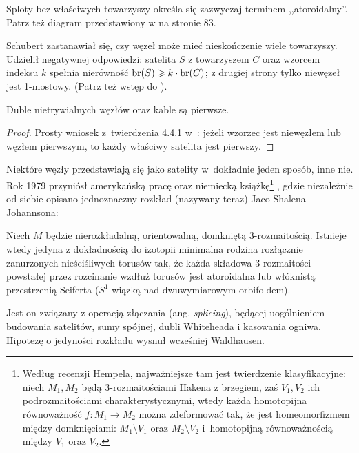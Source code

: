 Sploty bez właściwych towarzyszy określa się zazwyczaj terminem ,,atoroidalny''.
%
Patrz też diagram przedstawiony w \cite{cromwell2004} na stronie 83.

Schubert \cite{schubert1954} zastanawiał się, czy węzeł może mieć nieskończenie wiele towarzyszy.
Udzielił negatywnej odpowiedzi: satelita $S$ z towarzyszem $C$ oraz wzorcem indeksu $k$ spełnia nierówność $\operatorname{br}(S) \geqslant k \cdot \operatorname{br}(C)$; z drugiej strony tylko niewęzeł jest 1-mostowy.
(Patrz też wstęp do \cite{schultens2003}).

\begin{proposition}
    Duble nietrywialnych węzłów oraz kable są pierwsze.
\end{proposition}

\begin{proof}
    Prosty wniosek z~twierdzenia 4.4.1 w~\cite[s. 84]{cromwell2004}: jeżeli wzorzec jest niewęzłem lub węzłem pierwszym, to każdy właściwy satelita jest pierwszy.
\end{proof}

Niektóre węzły przedstawiają się jako satelity w~dokładnie jeden sposób, inne nie.
Rok 1979 przyniósł amerykańską pracę \cite{jaco1979} oraz niemiecką książkę\footnote{Według recenzji Hempela, najważniejsze tam jest twierdzenie klasyfikacyjne: niech $M_1, M_2$ będą 3-rozmaitościami Hakena  z brzegiem, zaś $V_1, V_2$ ich podrozmaitościami charakterystycznymi, wtedy każda homotopijna równoważność $f \colon M_1 \to M_2$ można zdeformować tak, że jest homeomorfizmem między domknięciami: $M_1 \setminus V_1$ oraz $M_2 \setminus V_2$ i~homotopijną równoważnością między $V_1$ oraz $V_2$.} \cite{johannson1979}, gdzie niezależnie od siebie opisano jednoznaczny rozkład (nazywany teraz) Jaco-Shalena-Johannsona:
%
%
%
%

\begin{proposition}
    Niech $M$ będzie nierozkładalną, orientowalną, domkniętą 3-rozmaitością.
    Istnieje wtedy jedyna z dokładnością do izotopii minimalna rodzina rozłącznie zanurzonych nieściśliwych torusów tak, że każda składowa 3-rozmaitości powstałej przez rozcinanie wzdłuż torusów jest atoroidalna lub włóknistą przestrzenią Seiferta ($S^1$-wiązką nad dwuwymiarowym orbifoldem).
%
%
%
%
\end{proposition}

Jest on związany z operacją złączania (ang. \emph{splicing}), będącej uogólnieniem budowania satelitów, sumy spójnej, dubli Whiteheada i kasowania ogniwa.
%
Hipotezę o jedyności rozkładu wysnuł wcześniej Waldhausen.
%


